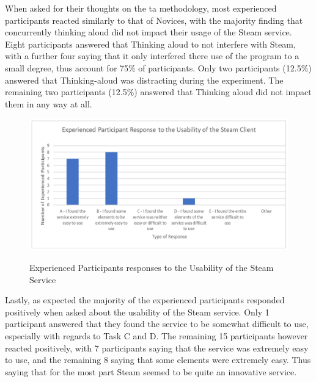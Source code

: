 When asked for their thoughts on the \gls{ta} methodology, most experienced participants reacted similarly to that of Novices, with the majority finding that concurrently thinking aloud did not impact their usage of the Steam service. Eight participants answered that Thinking aloud to not interfere with Steam, with a further four saying that it only interfered there use of the program to a small degree, thus account for 75\% of participants. Only two participants (12.5\%) answered that Thinking-aloud was distracting during the experiment. The remaining two participants (12.5\%) answered that Thinking aloud did not impact them in any way at all. 

\begin{figure}[H]
\includegraphics[width=\linewidth]{Screenshots/DemographicsQuestionaires/experiencedQuestionaireData/experiencedSteamClient.png}
\label{ExperiencedSteamUsability}
\caption{Experienced Participants responses to the Usability of the Steam Service}
\end{figure}

Lastly, as expected the majority of the experienced participants responded positively when asked about the usability of the Steam service. Only 1 participant answered that they found the service to be somewhat difficult to use, especially with regards to Task C and D. The remaining 15 participants however reacted positively, with 7 participants saying that the service was extremely easy to use, and the remaining 8 saying that some elements were extremely easy. Thus saying that for the most part Steam seemed to be quite an innovative service.
